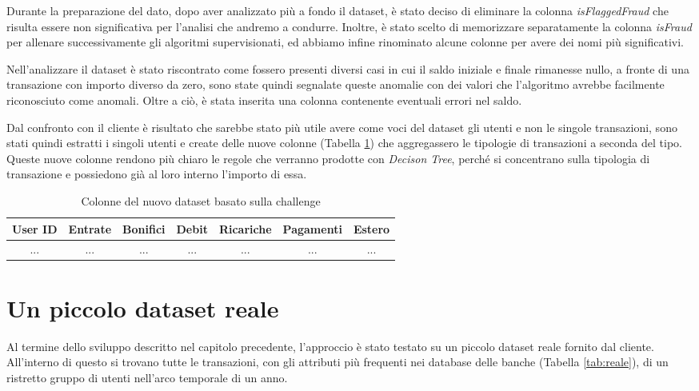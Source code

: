 Durante la preparazione del dato, dopo aver analizzato più a fondo il dataset, è stato deciso di eliminare la colonna \textit{isFlaggedFraud} che risulta essere non significativa per l'analisi che andremo a condurre. Inoltre, è stato scelto di memorizzare separatamente la colonna \textit{isFraud} per allenare successivamente gli algoritmi supervisionati, ed abbiamo infine rinominato alcune colonne per avere dei nomi più significativi.

Nell'analizzare il dataset è stato riscontrato come fossero presenti diversi casi in cui il saldo iniziale e finale rimanesse nullo, a fronte di una transazione con importo diverso da zero, sono state quindi segnalate queste anomalie con dei valori che l'algoritmo avrebbe facilmente riconosciuto come anomali. Oltre a ciò, è stata inserita una colonna contenente eventuali errori nel saldo.


Dal confronto con il cliente è risultato che sarebbe stato più utile avere come voci del dataset gli utenti e non le singole transazioni, sono stati quindi estratti i singoli utenti e create delle nuove colonne (Tabella \ref{tab:new}) che aggregassero le tipologie di transazioni a seconda del tipo. Queste nuove colonne rendono più chiaro le regole che verranno prodotte con \textit{Decison Tree}, perché si concentrano sulla tipologia di transazione e possiedono già al loro interno l'importo di essa. 



\begin{table}[H] %
\centering
\begin{tabular}{|c|c|c|c|c|c|c|} \hline
User ID & Entrate & Bonifici & Debit & Ricariche & Pagamenti & Estero
 \\ \hline
... & ... & ... & ... & ...& ... & ... \\ \hline
\end{tabular}
\caption{Colonne del nuovo dataset basato sulla challenge}
\label{tab:new}
\end{table}


\section{Un piccolo dataset reale}

Al termine dello sviluppo descritto nel capitolo precedente, l'approccio è stato testato su un piccolo dataset reale fornito dal cliente. 
All'interno di questo si trovano tutte le transazioni, con gli attributi più frequenti nei database delle banche (Tabella \ref{tab:reale}), di un ristretto gruppo di utenti nell'arco temporale di un anno.


